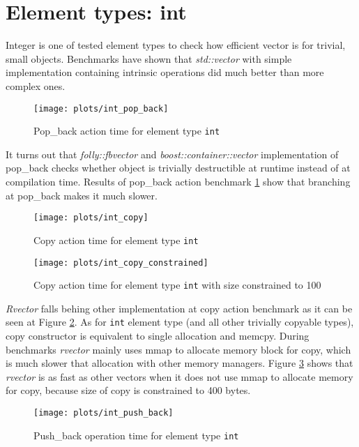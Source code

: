 \documentclass[inz, english, shortabstract]{iithesis}
\begin{document}
\section{Element types: int}
Integer is one of tested element types to check how efficient vector is for trivial, small objects. Benchmarks have shown that {\it std::vector} with simple implementation containing intrinsic operations did much better than more complex ones. 

\begin{figure}[h!]
\caption{Pop\_back action time for element type \lstinline{int}}
\label{int_pop_back}
\texttt{[image: plots/int\_pop\_back]}
\end{figure}

It turns out that {\it folly::fbvector} and {\it boost::container::vector} implementation of pop\_back checks whether object is trivially destructible at runtime instead of at compilation time. Results of pop\_back action benchmark \ref{int_pop_back} show that branching at pop\_back makes it much slower.

\begin{figure}[h!]
\caption{Copy action time for element type \lstinline{int}}
\label{int_copy}
\texttt{[image: plots/int\_copy]}
\end{figure}

\begin{figure}[h!]
\caption{Copy action time for element type \lstinline{int} with size constrained to 100}
\label{int_copy_constrained}
\texttt{[image: plots/int\_copy\_constrained]}
\end{figure}

{\it Rvector} falls behing other implementation at copy action benchmark as it can be seen at Figure \ref{int_copy}. As for \lstinline{int} element type (and all other trivially copyable types), copy constructor is equivalent to single allocation and memcpy. During benchmarks {\it rvector} mainly uses mmap to allocate memory block for copy, which is much slower that allocation with other memory managers. Figure \ref{int_copy_constrained} shows that {\it rvector} is as fast as other vectors when it does not use mmap to allocate memory for copy, because size of copy is constrained to 400 bytes.

\begin{figure}[h!]
\caption{Push\_back operation time for element type \lstinline{int}}
\label{int_push_back}
\texttt{[image: plots/int\_push\_back]}
\end{figure}
\end{document}
